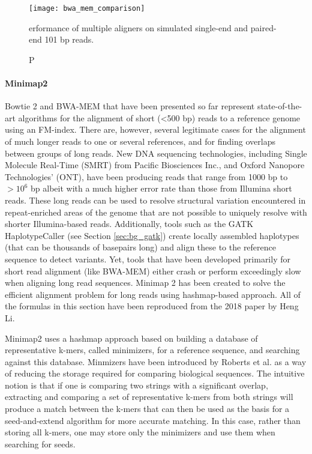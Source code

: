 \begin{figure}[H]
    \texttt{[image: bwa\_mem\_comparison]}
    \centering
    \caption Performance of multiple aligners on simulated single-end and paired-end 101 bp reads.\autocite{li2013aligning}
    \label{fig:bwa_mem_comparison}
\end{figure}

\paragraph{Minimap2}

Bowtie 2 and BWA-MEM that have been presented so far represent state-of-the-art algorithms for the alignment of short (<500 bp) reads to a reference genome using an FM-index. There are, however, several legitimate cases for the alignment of much longer reads to one or several references, and for finding overlaps between groups of long reads. New DNA sequencing technologies, including Single Molecule Real-Time (SMRT)\autocite{rhoads2015pacbio} from Pacific Biosciences Inc., and Oxford Nanopore Technologies' (ONT)\autocite{lu2016oxford}, have been producing reads that range from 1000 bp to $>10^6$ bp albeit with a much higher error rate than those from Illumina short reads. These long reads can be used to resolve structural variation encountered in repeat-enriched areas of the genome that are not possible to uniquely resolve with shorter Illumina-based reads\autocite{roberts2013advantages}. Additionally, tools such as the GATK HaplotypeCaller (see Section \ref{sec:bg_gatk}) create locally assembled haplotypes (that can be thousands of basepairs long) and align these to the reference sequence to detect variants. Yet, tools that have been developed primarily for short read alignment (like BWA-MEM) either crash or perform exceedingly slow when aligning long read sequences. Minimap 2\autocite{li2018minimap2} has been created to solve the efficient alignment problem for long reads using hashmap-based approach. All of the formulas in this section have been reproduced from the 2018 paper by Heng Li\autocite{li2018minimap2}.

Minimap2 uses a hashmap approach based on building a database of representative k-mers, called minimizers, for a reference sequence, and searching against this database. Minmizers have been introduced by Roberts et al.\autocite{roberts2004reducing} as a way of reducing the storage required for comparing biological sequences. The intuitive notion is that if one is comparing two strings with a significant overlap, extracting and comparing a set of representative k-mers from both strings will produce a match between the k-mers that can then be used as the basis for a seed-and-extend algorithm for more accurate matching. In this case, rather than storing all k-mers, one may store only the minimizers and use them when searching for seeds.

